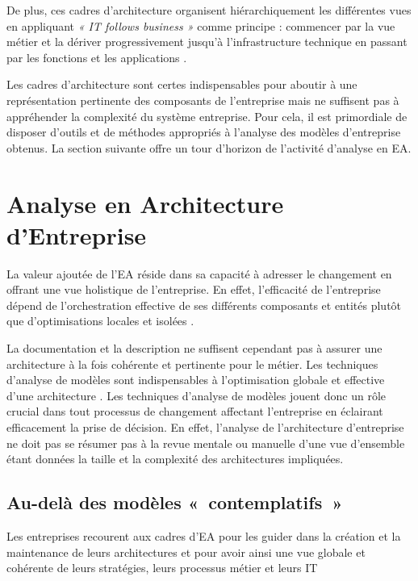De plus, ces cadres d'architecture organisent hiérarchiquement les différentes vues en
appliquant \emph{« IT follows business »} comme principe : commencer par la
vue métier et la dériver progressivement jusqu'à l'infrastructure
technique en passant par les fonctions et les applications
\cite{winter2006essential}. 

Les cadres d'architecture sont certes indispensables pour aboutir à une représentation pertinente des composants de l'entreprise mais ne suffisent pas à appréhender la complexité du système entreprise. Pour cela, il est primordiale de disposer d'outils et de méthodes appropriés à l'analyse des modèles d'entreprise obtenus. La section suivante offre un tour d'horizon de l'activité d'analyse en EA. 

\section{Analyse en Architecture d'Entreprise}

La valeur ajoutée de l'EA réside dans sa capacité à adresser le changement en
offrant une vue holistique de l'entreprise. En effet, l'efficacité de
l'entreprise dépend de l'orchestration effective de ses différents composants
et entités plutôt que d'optimisations locales et isolées
\cite{nadler1992organizational}. 

La documentation et la description ne suffisent cependant pas à assurer une
architecture à la fois cohérente et pertinente pour le métier. Les techniques
d'analyse de modèles sont indispensables à l'optimisation globale et effective
d'une architecture \cite{lankhorst2013enterprise}. Les techniques d'analyse de
modèles jouent donc un rôle crucial dans tout processus de changement affectant
l'entreprise en éclairant efficacement la prise de décision. En effet,
l'analyse de l'architecture d'entreprise ne doit pas se résumer pas à la revue
mentale ou manuelle d'une vue d'ensemble étant données la taille et la
complexité des architectures impliquées.

\subsection{Au-delà des modèles «~contemplatifs~»}

Les entreprises recourent aux cadres d'EA pour les guider dans la création et
la maintenance de leurs architectures et pour avoir ainsi une vue globale et
cohérente de leurs stratégies, leurs processus métier et leurs IT 

